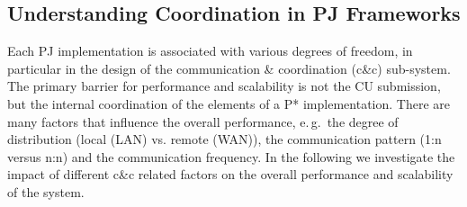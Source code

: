 \documentclass[conference,final]{IEEEtran}
\newcommand{\jhanote}[1]{ {\textcolor{red} { ***shantenu: #1 }}}
\newcommand{\alnote}[1]{ {\textcolor{blue} { ***andreL: #1 }}}
\newcommand{\amnote}[1]{ {\textcolor{blue} { ***andreM: #1 }}}
\newcommand{\alnote}[1]{}
\newcommand{\amnote}[1]{}
\newcommand{\jhanote}[1]{}
\newcommand{\cu}{CU\xspace}
\newcommand{\upp}{\vspace*{-0.5em}}
\begin{document}







\subsection{Understanding Coordination in PJ Frameworks\upp\upp}
\label{sec:pj_performance}

Each PJ implementation is associated with various degrees of freedom,
in particular in the design of the communication \& coordination
(c\&c) sub-system.  The primary barrier for performance and
scalability is not the \cu  submission, but the internal coordination of
the elements of a P* implementation. There are many factors that
influence the overall performance, e.\,g.\ the degree of distribution
(local (LAN) vs. remote (WAN)), the communication pattern (1:n versus
n:n) and the communication frequency. In the following we investigate
the impact of different c\&c related factors on the overall
performance and scalability of the system.
\end{document}
